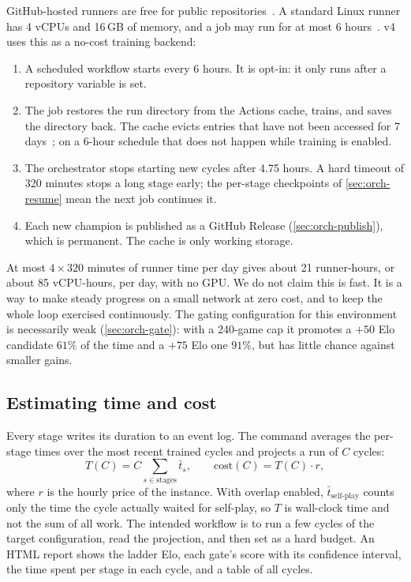 GitHub-hosted runners are free for public repositories~\citep{githubactionsbilling}. A
standard Linux runner has 4 vCPUs and 16\,GB of memory, and a job may run for at most
6 hours~\citep{githubrunners}. v4 uses this as a no-cost training backend:
\begin{enumerate}
  \item A scheduled workflow starts every 6 hours. It is opt-in: it only runs after a
        repository variable is set.
  \item The job restores the run directory from the Actions cache, trains, and saves the
        directory back. The cache evicts entries that have not been accessed for 7
        days~\citep{githubactionscache}; on a 6-hour schedule that does not happen while
        training is enabled.
  \item The orchestrator stops starting new cycles after 4.75 hours. A hard timeout of
        320 minutes stops a long stage early; the per-stage checkpoints of
        \cref{sec:orch-resume} mean the next job continues it.
  \item Each new champion is published as a GitHub Release (\cref{sec:orch-publish}),
        which is permanent. The cache is only working storage.
\end{enumerate}
At most $4 \times 320$ minutes of runner time per day gives about 21 runner-hours, or
about 85 vCPU-hours, per day, with no GPU. We do not claim this is fast. It is a way to
make steady progress on a small network at zero cost, and to keep the whole loop
exercised continuously. The gating configuration for this environment is necessarily weak
(\cref{sec:orch-gate}): with a 240-game cap it promotes a $+50$ Elo candidate $61\%$ of
the time and a $+75$ Elo one $91\%$, but has little chance against smaller gains.

\subsection{Estimating time and cost}
\label{sec:infra-estimate}

Every stage writes its duration to an event log. The  command averages
the per-stage times over the most recent trained cycles and projects a run of $C$ cycles:
\begin{equation}
  T(C) = C \sum_{s \in \mathrm{stages}} \bar t_s, \qquad \mathrm{cost}(C) = T(C)\cdot r,
\end{equation}
where $r$ is the hourly price of the instance. With overlap enabled, $\bar t_{\text{self-play}}$
counts only the time the cycle actually waited for self-play, so $T$ is wall-clock time and
not the sum of all work. The intended workflow is to run a few cycles of the target
configuration, read the projection, and then set  as a hard budget.
An HTML report shows the ladder Elo, each gate's score with its confidence interval, the
time spent per stage in each cycle, and a table of all cycles.

